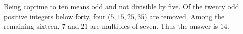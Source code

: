 Being coprime to ten means odd and not divisible by five. Of the twenty odd positive integers below forty, four ($ 5,15,25,35 $) are removed. Among the remaining sixteen, $ 7 $ and $ 21 $ are multiples of seven. Thus the answer is $\boxed{14}$.
